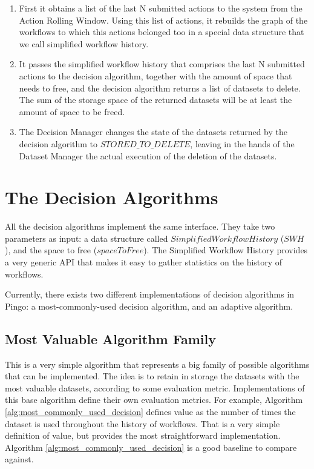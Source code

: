 \begin{enumerate}
\item First it obtains a list of the last N submitted actions to the system from the Action Rolling Window. Using this list of actions, it rebuilds the graph of the workflows to which this actions belonged too in a special data structure that we call simplified workflow history.
\item It passes the simplified workflow history that comprises the last N submitted actions to the decision algorithm, together with the amount of space that needs to free, and the decision algorithm returns a list of datasets to delete. The sum of the storage space of the returned datasets will be at least the amount of space to be freed.
\item The Decision Manager changes the state of the datasets returned by the decision algorithm to $STORED\_TO\_DELETE$, leaving in the hands of the Dataset Manager the actual execution of the deletion of the datasets.

\end{enumerate}

\section{The Decision Algorithms}
All the decision algorithms implement the same interface.  They take two parameters as input: a data structure called $Simplified Workflow History$ ($SWH$), and the space to free ($spaceToFree$).  The Simplified Workflow History provides a very generic API that makes it easy to gather statistics on the history of workflows.

Currently, there exists two different implementations of decision algorithms in Pingo: a most-commonly-used decision algorithm, and an adaptive algorithm.

\subsection{Most Valuable Algorithm Family}
This is a very simple algorithm that represents a big family of possible algorithms that can be implemented.  The idea is to retain in storage the datasets with the most valuable datasets, according to some evaluation metric.  Implementations of this base algorithm define their own evaluation metrics.  For example, Algorithm \ref{alg:most_commonly_used_decision} defines value as the number of times the dataset is used throughout the history of workflows. That is a very simple definition of value, but provides the most straightforward implementation.  Algorithm \ref{alg:most_commonly_used_decision} is a good baseline to compare against.

